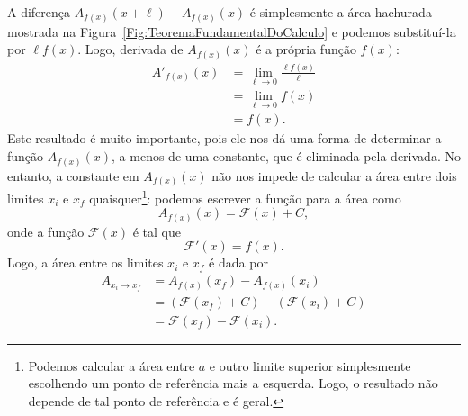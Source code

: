 \noindent{}A diferença $A_{f(x)}(x+\ell) - A_{f(x)}(x)$ é simplesmente a área hachurada mostrada na Figura~\ref{Fig:TeoremaFundamentalDoCalculo} e podemos substituí-la por $\ell f(x)$. Logo, derivada de $A_{f(x)}(x)$ é a própria função $f(x)$:
\begin{align}
  A'_{f(x)}(x) &= \lim_{\ell \to 0} \frac{\ell f(x)}{\ell} \\
  &= \lim_{\ell \to 0} f(x) \\
  &= f(x).
\end{align}
%
Este resultado é muito importante, pois ele nos dá uma forma de determinar a função $A_{f(x)}(x)$, a menos de uma constante, que é eliminada pela derivada. No entanto, a constante em $A_{f(x)}(x)$ não nos impede de calcular a área entre dois limites $x_i$ e $x_f$ quaisquer\footnote{Podemos calcular a área entre $a$ e outro limite superior simplesmente escolhendo um ponto de referência mais a esquerda. Logo, o resultado  não depende de tal ponto de referência e é geral.}: podemos escrever a função para a área como
\begin{equation}
    A_{f(x)}(x) = \mathcal{F}(x) + C,
 \end{equation}
 onde a função $\mathcal{F}(x)$ é tal que
 \begin{equation}
    \mathcal{F}'(x) = f(x).
\end{equation}
%
Logo, a área entre os limites $x_i$ e $x_f$ é dada por
\begin{align}
    A_{x_i\to x_f} &= A_{f(x)}(x_f) - A_{f(x)}(x_i) \\
    &= (\mathcal{F}(x_f) + C) - (\mathcal{F}(x_i) + C) \\
    &= \mathcal{F}(x_f) - \mathcal{F}(x_i).
\end{align}

